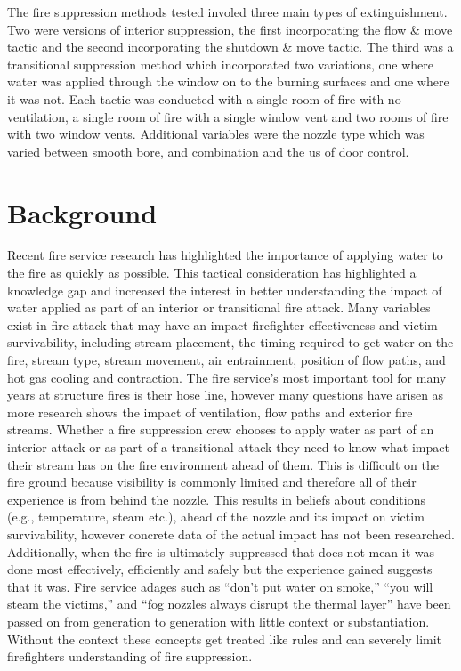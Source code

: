 \documentclass[12pt,oneside]{book}
\begin{document}
The fire suppression methods tested involed three main types of extinguishment. Two were versions of interior suppression, the first incorporating the flow \& move tactic and the second incorporating the shutdown \& move tactic. The third was a transitional suppression method which incorporated two variations, one where water was applied through the window on to the burning surfaces and one where it was not. Each tactic was conducted with a single room of fire with no ventilation, a single room of fire with a single window vent and two rooms of fire with two window vents. Additional variables were the nozzle type which was varied between smooth bore, and combination and the us of door control.

\clearpage

\chapter{Background}

Recent fire service research has highlighted the importance of applying water to the fire as quickly as possible. This tactical consideration has highlighted a knowledge gap and increased the interest in better understanding the impact of water applied as part of an interior or transitional fire attack. Many variables exist in fire attack that may have an impact firefighter effectiveness and victim survivability, including stream placement, the timing required to get water on the fire, stream type, stream movement, air entrainment, position of flow paths, and hot gas cooling and contraction. The fire service's most important tool for many years at structure fires is their hose line, however many questions have arisen as more research shows the impact of ventilation, flow paths and exterior fire streams. Whether a fire suppression crew chooses to apply water as part of an interior attack or as part of a transitional attack they need to know what impact their stream has on the fire environment ahead of them. This is difficult on the fire ground because visibility is commonly limited and therefore all of their experience is from behind the nozzle. This results in beliefs about conditions (e.g., temperature, steam etc.), ahead of the nozzle and its impact on victim survivability, however concrete data of the actual impact has not been researched. Additionally, when the fire is ultimately suppressed that does not mean it was done most effectively, efficiently and safely but the experience gained suggests that it was. Fire service adages such as ``don't put water on smoke,'' ``you will steam the victims,'' and ``fog nozzles always disrupt the thermal layer'' have been passed on from generation to generation with little context or substantiation. Without the context these concepts get treated like rules and can severely limit firefighters understanding of fire suppression.
\end{document}
